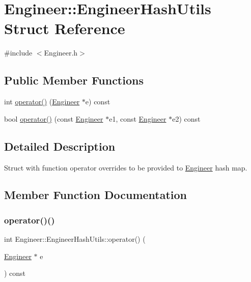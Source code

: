 \hypertarget{structEngineer_1_1EngineerHashUtils}{}\section{Engineer\+:\+:Engineer\+Hash\+Utils Struct Reference}
\label{structEngineer_1_1EngineerHashUtils}


{\ttfamily \#include $<$Engineer.\+h$>$}

\subsection*{Public Member Functions}
\begin{DoxyCompactItemize}
\item 
int \mbox{\hyperlink{structEngineer_1_1EngineerHashUtils_aa6e83d6d97278db4aad2f07a2cd42cb4}{operator()}} (\mbox{\hyperlink{classEngineer}{Engineer}} $\ast$e) const
\item 
bool \mbox{\hyperlink{structEngineer_1_1EngineerHashUtils_a4af5919a2a9ff2efd3ae3ec9171919d0}{operator()}} (const \mbox{\hyperlink{classEngineer}{Engineer}} $\ast$e1, const \mbox{\hyperlink{classEngineer}{Engineer}} $\ast$e2) const
\end{DoxyCompactItemize}


\subsection{Detailed Description}
Struct with function operator overrides to be provided to \mbox{\hyperlink{classEngineer}{Engineer}} hash map. 

\subsection{Member Function Documentation}
\mbox{\label{structEngineer_1_1EngineerHashUtils_aa6e83d6d97278db4aad2f07a2cd42cb4}} 
\subsubsection{\texorpdfstring{operator()()}{operator()()}\hspace{0.1cm}{\footnotesize\ttfamily [1/2]}}
{\footnotesize\ttfamily int Engineer\+::\+Engineer\+Hash\+Utils\+::operator() (\begin{DoxyParamCaption}\item[{\mbox{\hyperlink{classEngineer}{Engineer}} $\ast$}]{e }\end{DoxyParamCaption}) const\hspace{0.3cm}{\ttfamily [inline]}}

